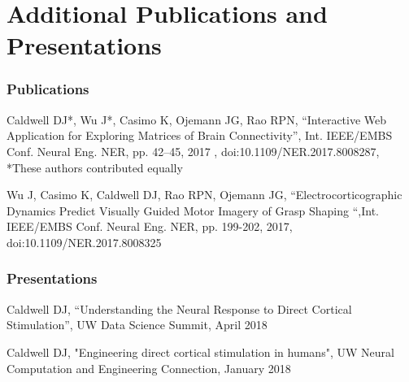 \chapter {Additional Publications and Presentations}

\subsection{Publications}

\noindent

\noindent Caldwell DJ*, Wu J*, Casimo K, Ojemann JG, Rao RPN, “Interactive Web Application for Exploring Matrices of Brain Connectivity”, Int. IEEE/EMBS Conf. Neural Eng. NER, pp. 42–45, 2017 , doi:10.1109/NER.2017.8008287, *These authors contributed equally
\medskip

\noindent Wu J, Casimo K, Caldwell DJ, Rao RPN, Ojemann JG, “Electrocorticographic Dynamics Predict Visually Guided Motor Imagery of Grasp Shaping “,Int. IEEE/EMBS Conf. Neural Eng. NER, pp. 199-202, 2017, doi:10.1109/NER.2017.8008325
\medskip

\subsection{Presentations}

\noindent Caldwell DJ, “Understanding the Neural Response to Direct Cortical Stimulation”, UW Data Science Summit, April 2018
\medskip

\noindent Caldwell DJ, "Engineering direct cortical stimulation in humans", UW Neural Computation and Engineering Connection, January 2018
\medskip
